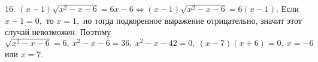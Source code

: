 16. $(x-1)\sqrt{x^2-x-6}=6x-6\Leftrightarrow(x-1)\sqrt{x^2-x-6}=6(x-1).$ Если $x-1=0,$ то $x=1,$ но тогда подкоренное выражение отрицательно, значит этот случай невозможен. Поэтому $\sqrt{x^2-x-6}=6,\ x^2-x-6=36,\ x^2-x-42=0,\ (x-7)(x+6)=0,\ x=-6$ или $x=7.$\\
